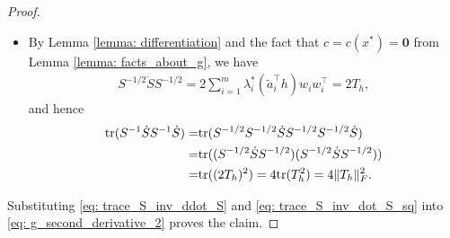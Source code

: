\documentclass[10pt,a4paper]{amsart}
\newcommand{\tr}{\mathrm{tr}}
\begin{document}
\begin{proof}
\begin{itemize}
\begin{align}
            = & 6\sum_{i=1}^m \lambda^*_i(\tilde{a}_i^\top h)^2\|w_i\|^2 - 2\|p_h\|^2  \notag \\
            = & 6n\sum_{i=1}^m \lambda^*_i(\tilde{a}_i^\top h)^2 - 2\|p_h\|^2. \notag
        \end{align}
        Moreover, it holds that 
        \begin{align}
            &\sum_{i=1}^m \lambda^*_i(\tilde{a}_i^\top h)^2  = \sum_{i=1}^m \lambda^*_i(w_i^\top p_h)^2 = p_h^\top \left(\sum_{i=1}^m \lambda^*_i w_iw_i^\top\right) p_h,\notag \\
            &\sum_{i=1}^m \lambda^*_i w_iw_i^\top = S^{-1/2}\left(\sum_{i=1}^m \lambda_i^*\tilde{a}_i\tilde{a}_i^\top \right)S^{-1/2} = S^{-1/2}SS^{-1/2} = I_n. \notag 
        \end{align}
        As a result, we have 
        \begin{align}\label{eq: trace_S_inv_ddot_S}
            \tr(S^{-1}\ddot{S}) = 2(3n-1)\|p_h\|^2.
        \end{align}

        \item By Lemma \ref{lemma: differentiation} and the fact that
        $c=c(x^*)=\mathbf{0}$ from Lemma \ref{lemma: facts_about_g}, we have
        \begin{align*}
            S^{-1/2} \dot{S} S^{-1/2} = 2\sum_{i=1}^m \lambda_i^* (\tilde{a}_i^\top h)w_iw_i^\top = 2T_h,
        \end{align*}
        and hence 
        \begin{align}\label{eq: trace_S_inv_dot_S_sq}
            \tr(S^{-1}\dot{S}S^{-1}\dot{S})  = &   \tr(S^{-1/2}S^{-1/2}\dot{S}S^{-1/2}S^{-1/2}\dot{S}) \notag \\
            = & \tr((S^{-1/2} \dot{S} S^{-1/2} )(S^{-1/2} \dot{S} S^{-1/2})) \notag  \\
            = & \tr((2T_h)^2) = 4\tr(T_h^2) = 4\|T_h\|_F^2.
        \end{align}
    \end{itemize}
    Substituting \eqref{eq: trace_S_inv_ddot_S} and
    \eqref{eq: trace_S_inv_dot_S_sq} into \eqref{eq: g_second_derivative_2} proves the claim.
\end{proof}
\end{document}
